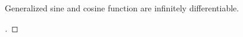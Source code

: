 \documentclass[stu, babel, american, biblatex, a4paper, draftall]{apa7}
\begin{document}
\begin{corollary}\label{TrigonometryContinuity}
    Generalized sine and cosine function are infinitely differentiable.
\end{corollary}
\begin{proof}[]




    \skipped


\end{proof}
\end{document}
